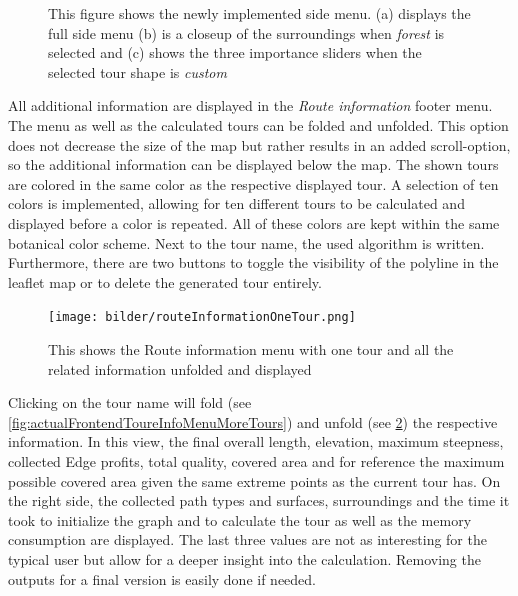 \begin{figure}[H]
	\centering
	\usebox{\measurebox}\qquad\hfill
	\begin{minipage}[b][\ht\measurebox][s]{.5\textwidth}
		\centering
		
		\vfill
		
	\end{minipage}
	\caption{This figure shows the newly implemented side menu. (a) displays the full side menu (b) is a closeup of the surroundings when \textit{forest} is selected and (c) shows the three importance sliders when the selected tour shape is \textit{custom}}
	\label{fig:actualFrontendSideMenu}
\end{figure}

All additional information are displayed in the \textit{Route information} footer menu. 
The menu as well as the calculated tours can be folded and unfolded.
This option does not decrease the size of the map but rather results in an added scroll-option, so the additional information can be displayed below the map.
The shown tours are colored in the same color as the respective displayed tour. 
A selection of ten colors is implemented, allowing for ten different tours to be calculated and displayed before a color is repeated. 
All of these colors are kept within the same botanical color scheme.
Next to the tour name, the used algorithm is written.
Furthermore, there are two buttons to toggle the visibility of the polyline in the leaflet map or to delete the generated tour entirely.

\begin{figure}[H]
	\centering
	\texttt{[image: bilder/routeInformationOneTour.png]}
	\caption{This shows the Route information menu with one tour and all the related information unfolded and displayed}
	\label{fig:actualFrontendToureInfoMenuOneTour}
\end{figure}

Clicking on the tour name will fold (see \ref{fig:actualFrontendToureInfoMenuMoreTours}) and unfold (see \ref{fig:actualFrontendToureInfoMenuOneTour}) the respective information.
In this view, the final overall length, elevation, maximum steepness, collected Edge profits, total quality, covered area and for reference the maximum possible covered area given the same extreme points as the current tour has.
On the right side, the collected path types and surfaces, surroundings and the time it took to initialize the graph and to calculate the tour as well as the memory consumption are displayed.
The last three values are not as interesting for the typical user but allow for a deeper insight into the calculation. 
Removing the outputs for a final version is easily done if needed. 



